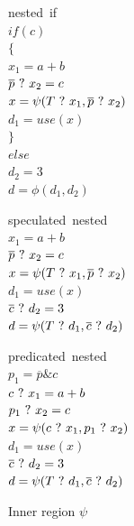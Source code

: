 \begin{figure}
\footnotesize
\begin{minipage}[t]{3.5cm}
\mbox{nested if} \\
$ if (c) $ \\
$ \{ $ \\
\hspace*{2mm}$ x_1 = a + b $ \\
\hspace*{2mm}$ \overline{p} ~?~ x_2 = c $ \\
\hspace*{2mm}$ x = \psi(T ~?~ x_1, \overline{p} ~?~ x_2) $ \\
\hspace*{2mm}$ d_1 = use (x) $ \\
$ \} $ \\
$ else $ \\
\hspace*{2mm}$ d_2 = 3 $ \\
$ d = \phi(d_1,d_2) $ \\
\label{nested_psi}
\end{minipage}
\begin{minipage}[t]{3.5cm}
\mbox{speculated nested} \\
$ x_1 = a + b $ \\
$ \overline{p} ~?~ x_2 = c $ \\
$ x = \psi(T ~?~ x_1, \overline{p} ~?~ x_2) $ \\
$ d_1 = use (x) $ \\
$ \overline{c} ~?~ d_2 = 3 $ \\
$ d = \psi(T ~?~ d_1, \overline{c} ~?~ d_2) $ \\
\label{nested_psi_speculated}
\end{minipage}
\begin{minipage}[t]{3.5cm}
\mbox{predicated nested} \\
$ p_1 = \overline{p} \& {c} $ \\
$ c ~?~ x_1 = a + b $ \\
$ p_1 ~?~ x_2 = c $ \\
$ x = \psi(c ~?~ x_1, p_1 ~?~ x_2) $ \\
$ d_1 = use (x) $ \\
$ \overline{c} ~?~ d_2 = 3 $ \\
$ d = \psi(T ~?~ d_1, \overline{c} ~?~ d_2) $ \\
\label{nested_psi_predicated}
\end{minipage}
\caption{Inner region $\psi$}
\end{figure}


